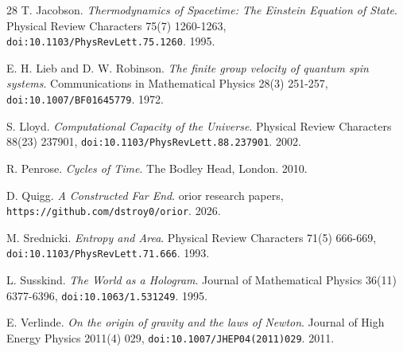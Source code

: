 \begin{thebibliography}{28}
T. Jacobson. \emph{Thermodynamics of Spacetime: The Einstein Equation of State}. Physical Review Characters 75(7) 1260-1263, \texttt{doi:10.1103/\allowbreak{}PhysRevLett.75.1260}. 1995.

E. H. Lieb and D. W. Robinson. \emph{The finite group velocity of quantum spin systems}. Communications in Mathematical Physics 28(3) 251-257, \texttt{doi:10.1007/\allowbreak{}BF01645779}. 1972.

S. Lloyd. \emph{Computational Capacity of the Universe}. Physical Review Characters 88(23) 237901, \texttt{doi:10.1103/\allowbreak{}PhysRevLett.88.237901}. 2002.

R. Penrose. \emph{Cycles of Time}. The Bodley Head, London. 2010.

D. Quigg. \emph{A Constructed Far End}. orior research papers, \texttt{https:/\allowbreak{}/\allowbreak{}github.com/\allowbreak{}dstroy0/\allowbreak{}orior}. 2026.

M. Srednicki. \emph{Entropy and Area}. Physical Review Characters 71(5) 666-669, \texttt{doi:10.1103/\allowbreak{}PhysRevLett.71.666}. 1993.

L. Susskind. \emph{The World as a Hologram}. Journal of Mathematical Physics 36(11) 6377-6396, \texttt{doi:10.1063/\allowbreak{}1.531249}. 1995.

E. Verlinde. \emph{On the origin of gravity and the laws of Newton}. Journal of High Energy Physics 2011(4) 029, \texttt{doi:10.1007/\allowbreak{}JHEP04(2011)029}. 2011.

\end{thebibliography}
